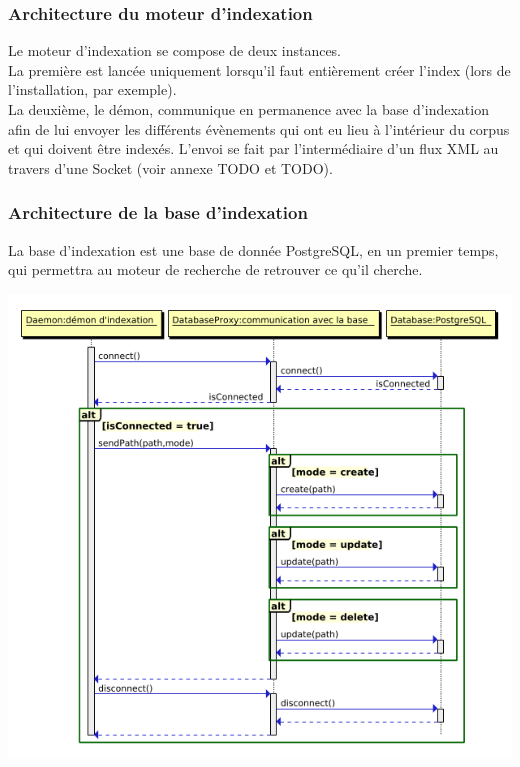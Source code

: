 \subsubsection{Architecture du moteur d'indexation}
Le moteur d'indexation se compose de deux instances.\\
La première est lancée uniquement lorsqu'il faut entièrement créer l'index (lors de l'installation, par exemple).\\
La deuxième, le démon, communique en permanence avec la base d'indexation afin de lui envoyer
les différents évènements qui ont eu lieu à l'intérieur du corpus et qui doivent être indexés.
L'envoi se fait par l'intermédiaire d'un flux XML au travers d'une Socket (voir annexe TODO et TODO).

\subsubsection{Architecture de la base d'indexation}
La base d'indexation est une base de donnée PostgreSQL, en un premier temps, qui permettra au moteur de recherche 
de retrouver ce qu'il cherche.

\begin{center}
\includegraphics[scale=0.5]{seqdbi.png}
\end{center}

